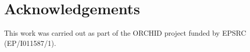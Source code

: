 \documentclass{aamas_demos}
\begin{document}


\maketitle





%

\vspace{-2mm}
%
\section*{Acknowledgements}
This work was carried out as part of the ORCHID project funded by EPSRC (EP/I011587/1). 

{
\small

}
\end{document}
